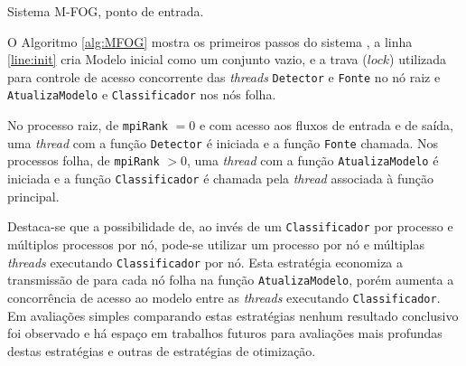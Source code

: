 

\begin{algorithm}[htb]
    
    \KwParams{\mpiRank, \mpiSize}
\caption{Sistema M-FOG, ponto de entrada.}
\label{alg:MFOG}
\end{algorithm}

O Algoritmo \ref{alg:MFOG} mostra os primeiros passos do sistema \mfog, a
linha \ref{line:init} cria Modelo inicial como um conjunto vazio, e a trava
($lock$) utilizada para controle de acesso concorrente das \emph{threads}
\texttt{Detector} e \texttt{Fonte} no nó raiz e \texttt{AtualizaModelo} e
\texttt{Classificador} nos nós folha.

No processo raiz, de \texttt{mpiRank} $= 0$ e com acesso aos fluxos de entrada e
de saída, uma \emph{thread} com a função \texttt{Detector} é iniciada e a função
\texttt{Fonte} chamada.
Nos processos folha, de \texttt{mpiRank} $> 0$, uma \emph{thread} com a função
\texttt{AtualizaModelo} é iniciada e a função \texttt{Classificador} é chamada
pela \emph{thread} associada à função principal.

Destaca-se que a possibilidade de, ao invés de um \texttt{Classificador} por
processo e múltiplos processos por nó, pode-se utilizar um processo por nó
e múltiplas \emph{threads} executando \texttt{Classificador} por nó.
Esta estratégia economiza a transmissão de \mclusters para cada nó folha na
função \texttt{AtualizaModelo}, porém aumenta a concorrência de acesso ao modelo
entre as \emph{threads} executando \texttt{Classificador}.
Em avaliações simples comparando estas estratégias nenhum resultado conclusivo
foi observado e há espaço em trabalhos futuros para avaliações mais profundas
destas estratégias e outras de estratégias de otimização.


